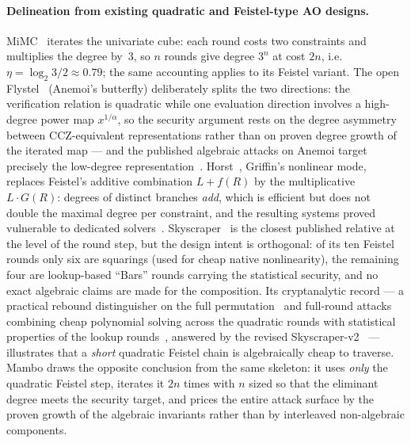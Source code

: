 \documentclass[11pt,a4paper]{article}
\theoremstyle{definition}
\begin{document}
\paragraph{Delineation from existing quadratic and Feistel-type AO designs.}
MiMC~\cite{MiMC} iterates the univariate cube: each round costs two
constraints and multiplies the degree by~$3$, so $n$ rounds give degree
$3^n$ at cost $2n$, i.e.\ $\eta = \log_2 3 / 2 \approx 0.79$; the same
accounting applies to its Feistel variant. The open
Flystel~\cite{Anemoi} (Anemoi's butterfly) deliberately splits the two
directions: the verification relation is quadratic while one
evaluation direction involves a high-degree power map $x^{1/\alpha}$,
so the security argument rests on the degree asymmetry between
CCZ-equivalent representations rather than on proven degree growth of
the iterated map --- and the published algebraic attacks on Anemoi
target precisely the low-degree representation~\cite{Anemoi_attack,FreeLunch}.
Horst~\cite{Griffin}, Griffin's nonlinear mode, replaces Feistel's
additive combination $L + f(R)$ by the multiplicative $L \cdot G(R)$:
degrees of distinct branches \emph{add}, which is efficient but does
not double the maximal degree per constraint, and the resulting
systems proved vulnerable to dedicated
solvers~\cite{FreeLunch,Griffin_break}. Skyscraper~\cite{Skyscraper}
is the closest published relative at the level of the round step, but
the design intent is orthogonal: of its ten Feistel rounds only six
are squarings (used for cheap native nonlinearity), the remaining four
are lookup-based ``Bars'' rounds carrying the statistical security,
and no exact algebraic claims are made for the composition. Its
cryptanalytic record --- a practical rebound distinguisher on the full
permutation~\cite{Skyscraper_dist} and full-round attacks combining
cheap polynomial solving across the quadratic rounds with statistical
properties of the lookup rounds~\cite{Skyscraper_break}, answered by
the revised Skyscraper-v2~\cite{Skyscraper} --- illustrates that a
\emph{short} quadratic Feistel chain is algebraically cheap to
traverse. Mambo draws the opposite conclusion from the same skeleton:
it uses \emph{only} the quadratic Feistel step, iterates it $2n$ times
with $n$ sized so that the eliminant degree meets the security
target, and prices the entire attack surface by the proven growth of
the algebraic invariants rather than by interleaved non-algebraic
components.
\end{document}
